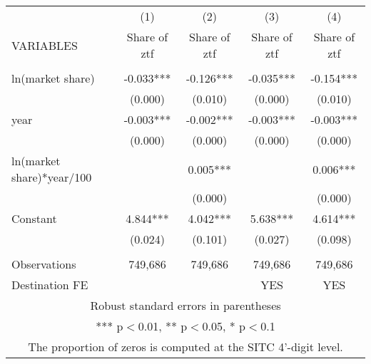 \begin{tabular}{lcccc} \hline
 & (1) & (2) & (3) & (4) \\
VARIABLES & Share of ztf & Share of ztf & Share of ztf & Share of ztf \\ \hline
 &  &  &  &  \\
ln(market share) & -0.033*** & -0.126*** & -0.035*** & -0.154*** \\
 & (0.000) & (0.010) & (0.000) & (0.010) \\
year & -0.003*** & -0.002*** & -0.003*** & -0.003*** \\
 & (0.000) & (0.000) & (0.000) & (0.000) \\
ln(market share)*year/100 &  & 0.005*** &  & 0.006*** \\
 &  & (0.000) &  & (0.000) \\
Constant & 4.844*** & 4.042*** & 5.638*** & 4.614*** \\
 & (0.024) & (0.101) & (0.027) & (0.098) \\
 &  &  &  &  \\
Observations & 749,686 & 749,686 & 749,686 & 749,686 \\
 Destination FE &  &  & YES & YES \\ \hline
\multicolumn{5}{c}{ Robust standard errors in parentheses} \\
\multicolumn{5}{c}{ *** p$<$0.01, ** p$<$0.05, * p$<$0.1} \\
\multicolumn{5}{c}{ The proportion of zeros is computed at the SITC 4'-digit level.} \\
\end{tabular}
